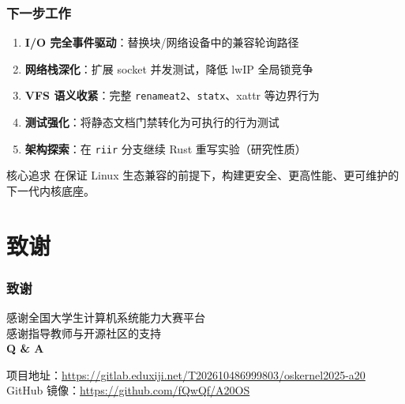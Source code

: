 \documentclass[aspectratio=1610]{beamer}
\newcommand{\code}[1]{\texttt{\footnotesize #1}}
\newcommand{\high}[1]{\textbf{\textcolor{ThemeColor}{#1}}}
\begin{document}
\begin{frame}
    \frametitle{下一步工作}
    \begin{enumerate}
        \item \high{I/O 完全事件驱动}：替换块/网络设备中的兼容轮询路径
        \item \high{网络栈深化}：扩展 socket 并发测试，降低 lwIP 全局锁竞争
        \item \high{VFS 语义收紧}：完整 \code{renameat2}、\code{statx}、xattr 等边界行为
        \item \high{测试强化}：将静态文档门禁转化为可执行的行为测试
        \item \high{架构探索}：在 \code{riir} 分支继续 Rust 重写实验（研究性质）
    \end{enumerate}
    \vspace{0.5em}
    \begin{block}{核心追求}
        在保证 Linux 生态兼容的前提下，构建更安全、更高性能、更可维护的下一代内核底座。
    \end{block}
\end{frame}

\section*{致谢}

\begin{frame}
    \frametitle{致谢}
    \begin{center}
        \vspace{2em}
        {\Large 感谢全国大学生计算机系统能力大赛平台}\\[0.8em]
        {\Large 感谢指导教师与开源社区的支持}\\[2em]
        \vspace{1em}
        {\Large\high{Q \& A}}
        \vspace{2em}

        \small
        项目地址：\url{https://gitlab.eduxiji.net/T202610486999803/oskernel2025-a20}\\
        GitHub 镜像：\url{https://github.com/fQwQf/A20OS}
    \end{center}
\end{frame}
\end{document}
